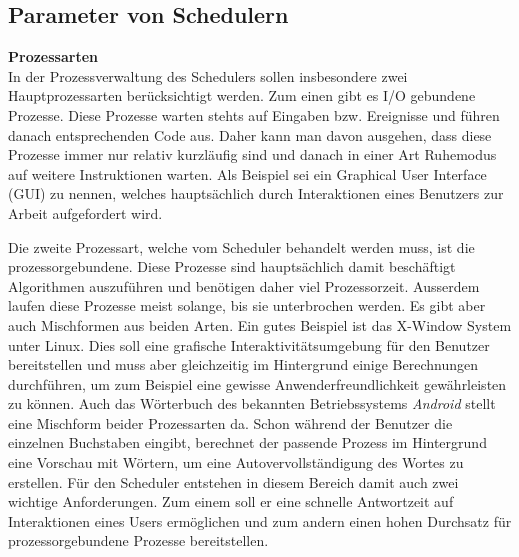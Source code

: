 \subsection{Parameter von Schedulern}
\textbf{Prozessarten}\\
In der Prozessverwaltung des Schedulers sollen insbesondere zwei Hauptprozessarten berücksichtigt werden. Zum einen gibt es I/O gebundene Prozesse. Diese Prozesse warten stehts auf Eingaben bzw. Ereignisse und führen danach entsprechenden Code aus. Daher kann man davon ausgehen, dass diese Prozesse immer nur relativ kurzläufig sind und danach in einer Art Ruhemodus auf weitere Instruktionen warten. Als Beispiel sei ein Graphical User Interface (GUI) zu nennen, welches hauptsächlich durch Interaktionen eines Benutzers zur Arbeit aufgefordert wird.

Die zweite Prozessart, welche vom Scheduler behandelt werden muss, ist die prozessorgebundene. Diese Prozesse sind hauptsächlich damit beschäftigt Algorithmen auszuführen und be\-nötigen daher viel Prozessorzeit. Ausserdem laufen diese Prozesse meist solange, bis sie unterbrochen werden.
Es gibt aber auch Mischformen aus beiden Arten. Ein gutes Beispiel ist das X-Window System unter Linux. Dies soll eine grafische Interaktivitätsumgebung für den Benutzer bereitstellen und muss aber gleichzeitig im Hintergrund einige Berechnungen durchführen, um zum Beispiel eine gewisse Anwenderfreundlichkeit gewähr\-leis\-ten zu können. 
Auch das Wörterbuch des bekannten Betriebssystems \textit{Android} stellt eine Mischform beider Prozessarten da. Schon während der Benutzer die einzelnen Buchstaben eingibt, berechnet der passende Prozess im Hintergrund eine Vorschau mit Wörtern, um eine Auto\-ver\-voll\-ständigung des Wortes zu erstellen.
Für den Scheduler entstehen in diesem Bereich damit auch zwei wichtige Anforderungen. Zum einem soll er eine schnelle Antwortzeit auf Interaktionen eines Users ermöglichen und zum andern einen hohen Durchsatz für prozessorgebundene Prozesse bereitstellen.

